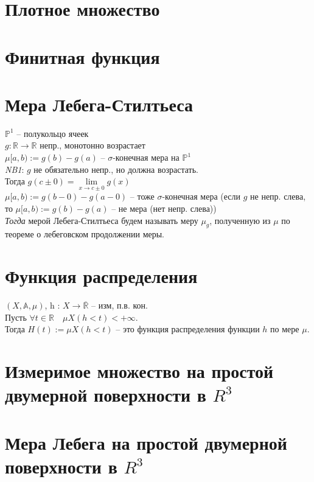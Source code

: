 \documentclass[paper=a4, fontsize=17pt]{article}
\begin{document}
	\section{Плотное множество}
	
	\section{Финитная функция}
	
	\section{Мера Лебега-Стилтьеса}
	$\mathbb{P}^1$ -- полукольцо ячеек \\
	$g : \mathbb{R} \rightarrow \mathbb{R}$ непр., монотонно возрастает \\
	$\mu [a, b):=g(b) - g(a)$ -- $\sigma$-конечная мера на $\mathbb{P}^1$ \\
	
	\emph{NB1}: $g$ не обязательно непр., но должна возрастать. \\
	Тогда $g(c \pm 0)=\lim\limits_{x \rightarrow c \pm 0} g(x)$ \\ 
	$\mu [a, b):=g(b - 0) - g(a - 0)$ -- тоже $\sigma$-конечная мера (если $g$ не непр. слева, то $\mu [a, b):=g(b) - g(a)$ -- не мера (нет непр. слева)) \\
	
	
	\emph{Тогда} мерой Лебега-Стилтьеса будем называть меру $\mu_g$, полученную из $\mu$ по теореме о лебеговском продолжении меры.
	
	\section{Функция распределения}
	$(X, \mathds{A}, \mu) $, h : $X \rightarrow \overline{\mathbb{R}}$ -- изм, п.в. кон.\\
	
	Пусть $\forall t \in \mathbb{R}\quad \mu X(h < t) < +\infty$.\\
	Тогда $H(t):=\mu X(h < t)$ -- это функция распределения функции $h$ по мере $\mu$.
	
	\section{Измеримое множество на простой двумерной поверхности в $R^3$}
	
	\section{Мера Лебега на простой двумерной поверхности в $R^3$}
	
\end{document}
